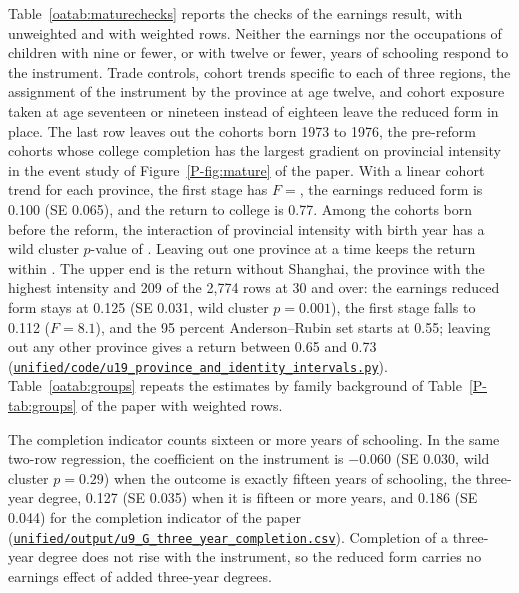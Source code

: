 \documentclass[11pt]{article}
\numberwithin{equation}{section}
\newcommand{\repourl}{https://github.com/JiachenJin1001/before-the-labor-market-or-inside-it}
\newcommand{\code}[1]{\href{\repourl/blob/main/#1}{\nolinkurl{#1}}}
\begin{document}
Table~\ref{oatab:maturechecks} reports the checks of the earnings
result, with unweighted and with weighted rows. Neither the earnings nor the occupations of children with nine or fewer, or with twelve or fewer, years of schooling respond to the instrument. Trade controls, cohort trends specific to each of three regions,
the assignment of the instrument by the province at age twelve,
and cohort exposure taken at age seventeen or nineteen instead of eighteen
leave the reduced form in place. The last row leaves out the cohorts born 1973 to 1976, the pre-reform cohorts whose college completion has the largest gradient on provincial intensity in the event study of Figure~\ref{P-fig:mature} of the paper. With a linear cohort trend for each province, the first stage has $F = $, the earnings reduced form is 0.100 (SE 0.065), and the return to college is 0.77. Among the cohorts born before the reform, the
interaction of provincial intensity with birth year has a wild cluster
$p$-value of . Leaving out one
province at a time keeps the return within
. The upper end is the return without Shanghai, the province with the highest intensity and 209 of the 2,774 rows at 30 and over: the earnings reduced form stays at 0.125 (SE 0.031, wild cluster $p = 0.001$), the first stage falls to 0.112 ($F = 8.1$), and the 95 percent Anderson--Rubin set starts at 0.55; leaving out any other province gives a return between 0.65 and 0.73 (\code{unified/code/u19_province_and_identity_intervals.py}). Table~\ref{oatab:groups} repeats the
estimates by family background of Table~\ref{P-tab:groups} of the paper
with weighted rows.

The completion indicator counts sixteen or more years of schooling. In the same two-row regression, the coefficient on the instrument is $-0.060$ (SE 0.030, wild cluster $p = 0.29$) when the outcome is exactly fifteen years of schooling, the three-year degree, 0.127 (SE 0.035) when it is fifteen or more years, and 0.186 (SE 0.044) for the completion indicator of the paper (\code{unified/output/u9_G_three_year_completion.csv}). Completion of a three-year degree does not rise with the instrument, so the reduced form carries no earnings effect of added three-year degrees.
\end{document}
